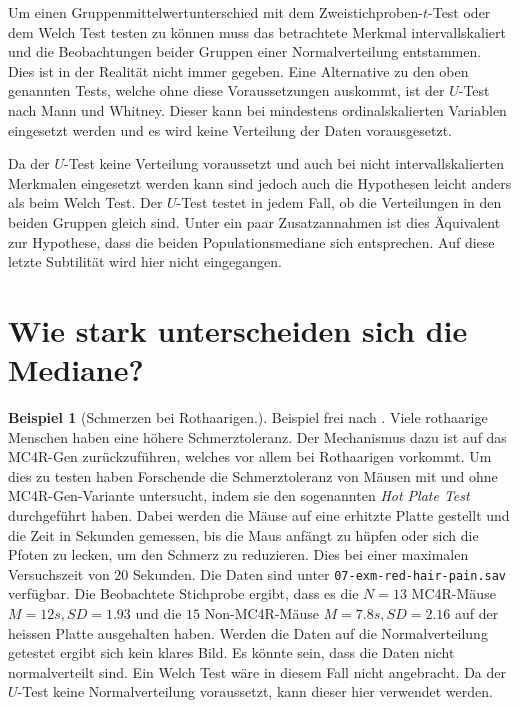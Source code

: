\documentclass[
]{book}
\theoremstyle{definition}
\theoremstyle{definition}
\newtheorem{example}{Beispiel}[chapter]
\theoremstyle{definition}
\theoremstyle{definition}
\theoremstyle{remark}
\begin{document}
Um einen Gruppenmittelwertunterschied mit dem Zweistichproben-\(t\)-Test oder dem Welch Test testen zu können muss das betrachtete Merkmal intervallskaliert und die Beobachtungen beider Gruppen einer Normalverteilung entstammen. Dies ist in der Realität nicht immer gegeben. Eine Alternative zu den oben genannten Tests, welche ohne diese Voraussetzungen auskommt, ist der \(U\)-Test nach Mann und Whitney. Dieser kann bei mindestens ordinalskalierten Variablen eingesetzt werden und es wird keine Verteilung der Daten vorausgesetzt.

Da der \(U\)-Test keine Verteilung voraussetzt und auch bei nicht intervallskalierten Merkmalen eingesetzt werden kann sind jedoch auch die Hypothesen leicht anders als beim Welch Test. Der \(U\)-Test testet in jedem Fall, ob die Verteilungen in den beiden Gruppen gleich sind. Unter ein paar Zusatzannahmen ist dies Äquivalent zur Hypothese, dass die beiden Populationsmediane sich entsprechen. Auf diese letzte Subtilität wird hier nicht eingegangen.

\section{Wie stark unterscheiden sich die Mediane?}\label{wie-stark-unterscheiden-sich-die-mediane}

\begin{example}[Schmerzen bei Rothaarigen.]
\protect\hypertarget{exm:red-hair-pain}{}\label{exm:red-hair-pain}Beispiel frei nach \citet{robinson2021}. Viele rothaarige Menschen haben eine höhere Schmerztoleranz. Der Mechanismus dazu ist auf das MC4R-Gen zurückzuführen, welches vor allem bei Rothaarigen vorkommt. Um dies zu testen haben Forschende die Schmerztoleranz von Mäusen mit und ohne MC4R-Gen-Variante untersucht, indem sie den sogenannten \emph{Hot Plate Test} durchgeführt haben. Dabei werden die Mäuse auf eine erhitzte Platte gestellt und die Zeit in Sekunden gemessen, bis die Maus anfängt zu hüpfen oder sich die Pfoten zu lecken, um den Schmerz zu reduzieren. Dies bei einer maximalen Versuchszeit von \(20\) Sekunden. Die Daten sind unter \texttt{07-exm-red-hair-pain.sav} verfügbar. Die Beobachtete Stichprobe ergibt, dass es die \(N = 13\) MC4R-Mäuse \(M = 12s, SD = 1.93\) und die \(15\) Non-MC4R-Mäuse \(M = 7.8s, SD = 2.16\) auf der heissen Platte ausgehalten haben. Werden die Daten auf die Normalverteilung getestet ergibt sich kein klares Bild. Es könnte sein, dass die Daten nicht normalverteilt sind. Ein Welch Test wäre in diesem Fall nicht angebracht. Da der \(U\)-Test keine Normalverteilung voraussetzt, kann dieser hier verwendet werden.
\end{example}
\end{document}
